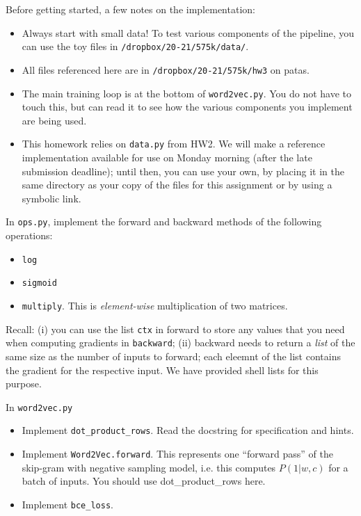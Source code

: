 \documentclass[11pt]{article}
\begin{document}
Before getting started, a few notes on the implementation:
\begin{itemize}
  \item Always start with small data!  To test various components of the pipeline, you can use the toy files in \texttt{/dropbox/20-21/575k/data/}.
  \item All files referenced here are in \texttt{/dropbox/20-21/575k/hw3} on patas.
  \item The main training loop is at the bottom of \texttt{word2vec.py}.  You do not have to touch this, but can read it to see how the various components you implement are being used.
  \item This homework relies on \texttt{data.py} from HW2. We will make a reference implementation available for use on Monday morning (after the late submission deadline); until then, you can use your own, by placing it in the same directory as your copy of the files for this assignment or by using a symbolic link.
\end{itemize}

\vspace{2em}
 In \texttt{ops.py}, implement the forward and backward methods of the following operations:
\begin{itemize}
  \item \texttt{log}
  \item \texttt{sigmoid}
  \item \texttt{multiply}.  This is \emph{element-wise} multiplication of two matrices.
\end{itemize}
Recall: (i) you can use the list \texttt{ctx} in forward to store any values that you need when computing gradients in \texttt{backward}; (ii) backward needs to return a \emph{list} of the same size as the number of inputs to forward; each eleemnt of the list contains the gradient for the respective input.  We have provided shell lists for this purpose.

\vspace{2em}
 In \texttt{word2vec.py}
\begin{itemize}
  \item Implement \texttt{dot\_product\_rows}.  Read the docstring for specification and hints.
  \item Implement \texttt{Word2Vec.forward}.  This represents one ``forward pass'' of the skip-gram with negative sampling model, i.e. this computes $P(1 | w, c)$ for a batch of inputs.  You should use dot\_product\_rows here.
  \item Implement \texttt{bce\_loss}.
\end{itemize}
\end{document}
